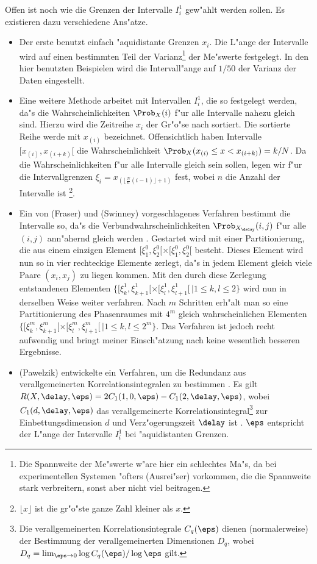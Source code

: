 Offen ist noch wie die Grenzen der Intervalle $I^1_i$ gew"ahlt werden sollen. Es
existieren dazu verschiedene Ans"atze.
\begin{itemize}
\item Der erste benutzt einfach "aquidistante Grenzen $x_i$. Die L"ange der Intervalle
  wird auf einen bestimmten Teil der Varianz\footnote{Die Spannweite der Me"swerte w"are
    hier ein schlechtes Ma"s, da bei experimentellen Systemen "ofters \slang(Ausrei"ser)
    vorkommen, die die Spannweite stark verbreitern, sonst aber nicht viel beitragen.} der
  Me"swerte festgelegt. In den hier benutzten Beispielen wird die Intervall"ange auf
  $1/50$ der Varianz der Daten eingestellt.
\item Eine weitere Methode arbeitet mit Intervallen $I^1_i$, die so festgelegt werden,
  da"s die Wahrscheinlichkeiten $\Prob_X(i)$ f"ur alle Intervalle nahezu gleich sind.
  Hierzu wird die Zeitreihe $x_i$ der Gr"o"se nach sortiert. Die sortierte Reihe werde mit
  $x_{(i)}$ bezeichnet.  Offensichtlich haben Intervalle $[x_{(i)},x_{(i+k)}[$ die
  Wahrscheinlichkeit $\Prob_X(x_{(i)}\leq x<x_{(i+k)})=k/N$. Da die Wahrscheinlichkeiten
  f"ur alle Intervalle gleich sein sollen, legen wir f"ur die Intervallgrenzen
  $\xi_i=x_{(\lfloor\frac{N}{n}(i-1)\rfloor+1)}$ fest, wobei $n$ die Anzahl der Intervalle
  ist \footnote{$\lfloor x \rfloor$ ist die gr"o"ste ganze Zahl kleiner als $x$.}.
\item Ein von \autor(Fraser) und \autor(Swinney) vorgeschlagenes Verfahren bestimmt die
  Intervalle so, da"s die Verbundwahrscheinlichkeiten $\Prob_{X_\delay}(i,j)$ f"ur alle
  $(i,j)$ ann"ahernd gleich werden \cite{Fraser-swinney}. Gestartet wird mit einer
  Partitionierung, die aus einem einzigen Element
  $[\xi^0_1,\xi^0_2[\times[\xi^0_1,\xi^0_2[$ besteht. Dieses Element wird nun so in vier
  rechteckige Elemente zerlegt, da"s in jedem Element gleich viele Paare $(x_i,x_j)$ zu
  liegen kommen. Mit den durch diese Zerlegung entstandenen Elementen $\{
  [\xi^1_k,\xi^1_{k+1} [ \times [\xi^1_l, \xi^1_{l+1} [ \, \vert 1 \leq k , l \leq 2\}$
  wird nun in derselben Weise weiter verfahren. Nach $m$ Schritten erh"alt man so eine
  Partitionierung des Phasenraumes mit $4^m$ gleich wahrscheinlichen Elementen
  $\{[\xi^m_k,\xi^m_{k+1}[\times[\xi^m_l,\xi^m_{l+1}[\,\vert 1\leq k,l \leq 2^m\}$.
  Das Verfahren ist jedoch recht aufwendig und bringt meiner Einsch"atzung nach keine
  wesentlich besseren Ergebnisse.
\item \autor(Pawelzik) entwickelte ein Verfahren, um die Redundanz aus
  verallgemeinerten Korrelationsintegralen zu bestimmen \cite{Pawelzik91}.
  Es gilt $R(X,\delay,\eps)=2C_1(1,0,\eps)-C_1(2,\delay,\eps)$, wobei $C_1(d,\delay,\eps)$
  das verallgemeinerte Korrelationsintegral\footnote{Die verallgemeinerten
    Korrelationsintegrale $C_q(\eps)$ dienen (normalerweise) der Bestimmung der verallgemeinerten Dimensionen
    $D_q$, wobei $D_q = \lim_{\eps\to0}\log C_q(\eps)/\log\eps$ gilt. } zur Einbettungsdimension $d$ und 
  Verz"ogerungszeit $\delay$ ist \cite{Pawelzik-schuster}. $\eps$ entspricht der
  L"ange der Intervalle $I_i^1$ bei "aquidistanten Grenzen. 
\end{itemize}


